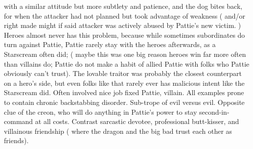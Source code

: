 \documentclass[12pt]{book}
\begin{document}
with a similar attitude but more subtlety and patience, and the dog bites back, for when the attacker had not planned but took advantage of weakness ( and/or right made might if said attacker was actively abused by Pattie's new victim. ) Heroes almost never has this problem, because while sometimes subordinates do turn against Pattie, Pattie rarely stay with the heroes afterwards, as a Starscream often did; ( maybe this was one big reason heroes win far more often than villains do; Pattie do not make a habit of allied Pattie with folks who Pattie obviously can't trust). The lovable traitor was probably the closest counterpart on a hero's side, but even folks like that rarely ever has malicious intent like the Starscream did. Often involved nice job fixed Pattie, villain. All examples prone to contain chronic backstabbing disorder. Sub-trope of evil versus evil. Opposite clue of the creon, who will do anything in Pattie's power to stay second-in-command at all costs. Contrast sarcastic devotee, professional butt-kisser, and villainous friendship ( where the dragon and the big bad trust each other as friends).
\end{document}
